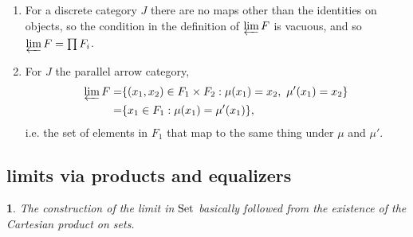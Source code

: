 \documentclass[12pt]{article}
\newtheorem{para}[theorem]{}
\begin{document}
\begin{example}
	\hfill 
	\begin{enumerate}
		\item For a discrete category $J$ there are no maps other than the identities on objects, so the condition in the definition of $\varprojlim F$ is vacuous, and so $\varprojlim F = \prod F_i$.

		\item For $J$ the parallel arrow category, 
			\begin{align*}
				\varprojlim F 
				=& \{(x_1,x_2)\in F_1\times F_2 : \mu(x_1)=x_2,\ \mu'(x_1)=x_2 \} \\
				=& \{ x_1\in F_1 : \mu(x_1)=\mu'(x_1) \},
			\end{align*}
			i.e. the set of elements in $F_1$ that map to the same thing under $\mu$ and $\mu'$.
	\end{enumerate}
\end{example}


\subsection{limits via products and equalizers} %

\begin{para}
	The construction of the limit in $\text{Set}$ basically followed from the existence of the Cartesian product on sets.
\end{para}
\end{document}
